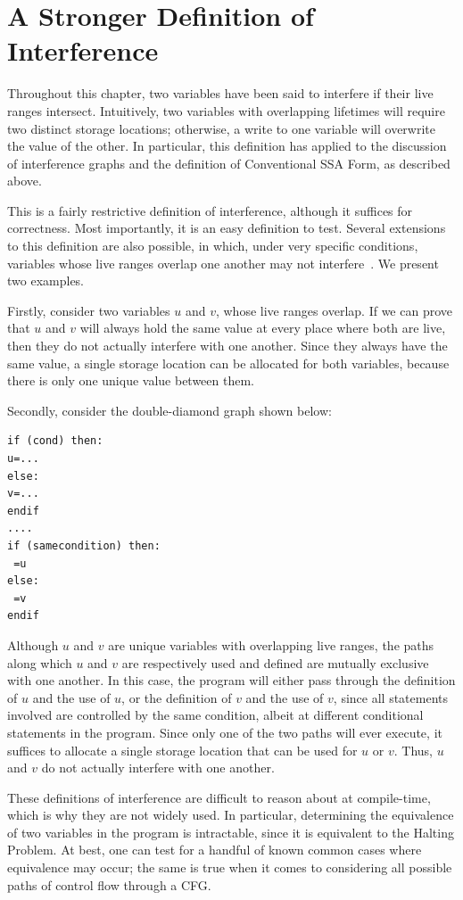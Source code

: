\section{A Stronger Definition of Interference}

Throughout this chapter, two variables have been said to interfere
if their live ranges intersect. Intuitively, two variables with overlapping
lifetimes will require two distinct storage locations; otherwise, a write
to one variable will overwrite the value of the other. In particular,
this definition has applied to the discussion of interference graphs
and the definition of Conventional SSA Form, as described above.

This is a fairly restrictive definition of interference, although it suffices
for correctness. Most importantly, it is an easy definition to test. 
Several extensions to this definition are also possible, in which,
under very specific conditions, variables whose live ranges overlap
one another may not interfere~\cite{Chaitin81, ChaitinJun82}. 
We present two examples.

Firstly, consider two variables $u$ and $v$, whose live ranges overlap.
If we can prove that $u$ and $v$ will always hold the same value
at every place where both are live, then they do not actually interfere
with one another. Since they always have the same value, a single 
storage location can be allocated for both variables, because there
is only one unique value between them.

Secondly, consider the double-diamond graph shown below:

\begin{verbatim}
if (cond) then:
u=...
else:
v=...
endif
....
if (samecondition) then:
 =u
else:
 =v
endif
\end{verbatim}

Although $u$ and $v$ are unique variables with overlapping live
ranges, the paths along which $u$ and $v$ are respectively used and
defined are mutually exclusive with one another. In this case, the
program will either pass through the definition of $u$ and the use
of $u$, or the definition of $v$ and the use of $v$, since all
statements involved are controlled by the same condition, albeit
at different conditional statements in the program. Since only
one of the two paths will ever execute, it suffices to allocate a 
single storage location that can be used for $u$ or $v$. Thus, $u$
and $v$ do not actually interfere with one another. 
 
These definitions of interference are difficult to reason about at 
compile-time, which is why they are not widely used. In particular,
determining the equivalence of two variables in the program is
intractable, since it is equivalent to the Halting Problem. At best,
one can test for a handful of known common cases where 
equivalence may occur; the same is true when it comes to considering
all possible paths of control flow through a CFG. 

